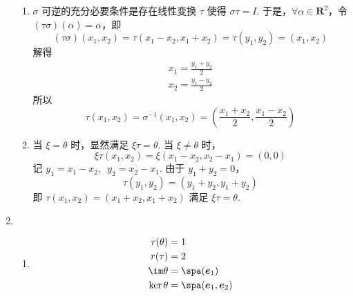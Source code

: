 \begin{enumerate}
\begin{enumerate}
              \item $ \sigma $ 可逆的充分必要条件是存在线性变换 $ \tau $ 使得 $ \sigma \tau = I $. 于是，$ \forall \alpha \in \mathbf{R}^2 $，令 $ (\tau \sigma)(\alpha) = \alpha $，即
                    \[ (\tau \sigma)(x_1, x_2) = \tau(x_1 - x_2, x_1 + x_2) = \tau(y_1, y_2) = (x_1, x_2) \]
                    解得
                    \begin{gather*}
                        x_1 = \frac{y_1 + y_2}{2} \\
                        x_2 = \frac{y_1 - y_2}{2}
                    \end{gather*}
                    所以
                    \[ \tau(x_1, x_2) = \sigma^{-1}(x_1, x_2) = \left(\frac{x_1 + x_2}{2}, \frac{x_1 - x_2}{2}\right) \]

              \item 当 $ \xi = \theta $ 时，显然满足 $ \xi \tau = \theta $. 当 $ \xi \neq \theta $ 时，
                    \[ \xi \tau(x_1, x_2) = \xi(x_1 - x_2, x_2 - x_1) = (0, 0) \]
                    记 $ y_1 = x_1 - x_2,\enspace y_2 = x_2 - x_1 $. 由于 $ y_1 + y_2 = 0 $，
                    \[ \tau(y_1, y_2) = (y_1 + y_2, y_1 + y_2) \]
                    即 $ \tau(x_1, x_2) = (x_1 + x_2, x_1 + x_2) $ 满足 $ \xi \tau = \theta $.
          \end{enumerate}

    \item \begin{enumerate}
              \item \begin{align*}
                        r(\theta)   & = 1                          \\
                        r(\tau)     & = 2                          \\
                        \im \theta  & = \spa(\vec{e}_1)            \\
                        \ker \theta & = \spa(\vec{e}_1, \vec{e}_2)
                    \end{align*}


\end{enumerate}
\end{enumerate}
